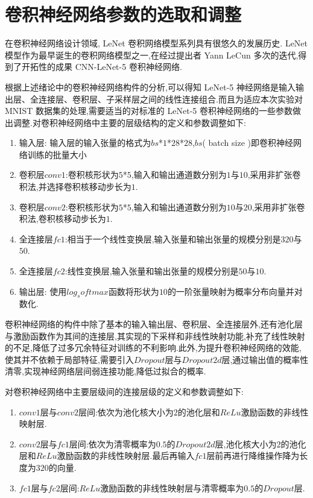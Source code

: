 \section{卷积神经网络参数的选取和调整}

在卷积神经网络设计领域, LeNet 卷积网络模型系列具有很悠久的发展历史. LeNet 模型作为最早诞生的卷积网络模型之一,在经过提出者 Yann LeCun 多次的迭代,得到了开拓性的成果 CNN-LeNet-5 卷积神经网络.

根据上述绪论中的卷积神经网络构件的分析,可以得知 LeNet-5 神经网络是输入输出层、全连接层、卷积层、子采样层之间的线性连接组合.而且为适应本次实验对 MNIST 数据集的处理,需要适当的对标准的 LeNet-5 卷积神经网络的一些参数做出调整.对卷积神经网络中主要的层级结构的定义和参数调整如下:

\begin{enumerate}
	\item 输入层: 输入层的输入张量的格式为$bs$*$1$*$28$*$28$,$bs$( batch size )即卷积神经网络训练的批量大小
	\item 卷积层$conv1$:卷积核形状为$5$*$5$,输入和输出通道数分别为$1$与$10$,采用非扩张卷积法,并选择卷积核移动步长为$1$.
	\item 卷积层$conv2$:卷积核形状为$5$*$5$,输入和输出通道数分别为$10$与$20$,采用非扩张卷积法,卷积核移动步长为$1$.
	\item 全连接层$fc1$:相当于一个线性变换层,输入张量和输出张量的规模分别是$320$与$50$.
	\item 全连接层$fc2$:线性变换层,输入张量和输出张量的规模分别是$50$与$10$.
	\item 输出层: 使用$log_softmax$函数将形状为$10$的一阶张量映射为概率分布向量并对数化.
\end{enumerate}

卷积神经网络的构件中除了基本的输入输出层、卷积层、全连接层外,还有池化层与激励函数作为其间的连接层,其实现的下采样和非线性映射功能,补充了线性映射的不足,降低了过多冗余特征对训练的不利影响.此外,为提升卷积神经网络的效能,使其并不依赖于局部特征,需要引入$Dropout$层与$Dropout2d$层,通过输出值的概率性清零,实现神经网络层间弱连接功能,降低过拟合的概率.

对卷积神经网络中主要层级间的连接层级的定义和参数调整如下:

\begin{enumerate}
	\item $conv1$层与$conv2$层间:依次为池化核大小为$2$的池化层和$ReLu$激励函数的非线性映射层.
	\item $conv2$层与$fc1$层间:依次为清零概率为$0.5$的$Dropout2d$层,池化核大小为$2$的池化层和$ReLu$激励函数的非线性映射层.最后再输入$fc1$层前再进行降维操作降为长度为$320$的向量.
	\item $fc1$层与$fc2$层间:$ReLu$激励函数的非线性映射层与清零概率为$0.5$的$Dropout$层.
\end{enumerate}

